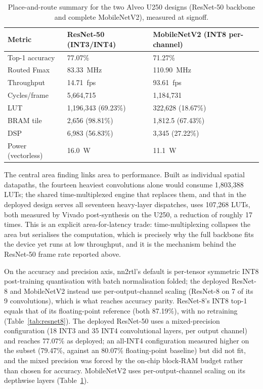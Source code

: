 \begin{table}[t]
\centering
\caption{Place-and-route summary for the two Alveo U250 designs (ResNet-50 backbone and complete MobileNetV2), measured at signoff.}
\label{tab:fullnet}
\small
\begin{tabular}{@{}p{}p{}p{}@{}}
\toprule
Metric & ResNet-50 (INT3/INT4) & MobileNetV2 (INT8 per-channel) \\
\midrule
Top-1 accuracy & 77.07\% & 71.27\% \\
Routed Fmax & 83.33~MHz & 110.90~MHz \\
Throughput & 14.71~fps & 93.61~fps \\
Cycles/frame & 5,664,715 & 1,184,731 \\
LUT & 1,196,343 (69.23\%) & 322,628 (18.67\%) \\
BRAM tile & 2,656 (98.81\%) & 1,812.5 (67.43\%) \\
DSP & 6,983 (56.83\%) & 3,345 (27.22\%) \\
Power (vectorless) & 16.0~W & 11.1~W \\
\bottomrule
\end{tabular}
\end{table}

The central area finding links area to performance. Built as individual spatial datapaths, the fourteen heaviest convolutions alone would consume 1,803,388 LUTs; the shared time-multiplexed engine that replaces them, and that in the deployed design serves all seventeen heavy-layer dispatches, uses 107,268 LUTs, both measured by Vivado post-synthesis on the U250, a reduction of roughly 17 times. This is an explicit area-for-latency trade: time-multiplexing collapses the area but serialises the computation, which is precisely why the full backbone fits the device yet runs at low throughput, and it is the mechanism behind the ResNet-50 frame rate reported above.

On the accuracy and precision axis, nn2rtl's default is per-tensor symmetric INT8 post-training quantisation with batch normalisation folded; the deployed ResNet-8 and MobileNetV2 instead use per-output-channel scaling (ResNet-8 on 7 of its 9 convolutions), which is what reaches accuracy parity. ResNet-8's INT8 top-1 equals that of its floating-point reference (both 87.19\%), with no retraining (Table~\ref{tab:resnet8}). The deployed ResNet-50 uses a mixed-precision configuration (18 INT3 and 35 INT4 convolutional layers, per output channel) and reaches 77.07\% as deployed; an all-INT4 configuration measured higher on the subset (79.47\%, against an 80.07\% floating-point baseline) but did not fit, and the mixed precision was forced by the on-chip block-RAM budget rather than chosen for accuracy. MobileNetV2 uses per-output-channel scaling on its depthwise layers (Table~\ref{tab:fullnet}).

